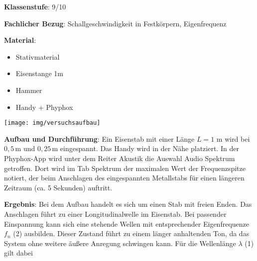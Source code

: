 \documentclass[../main.tex]{subfiles}
\begin{document}
\begin{tcolorbox}[
    width=\textwidth,
    height=\textheight,
    title=Phyphox: Schallgeschwindigkeit in Festkörpern,
    fonttitle=\Large,
    before title=\vspace{0.2cm}, after title=\vspace{0.2cm},
    colback=white,
    title filled=true, 
    colbacktitle=myorange,
    colframe=black,
    coltitle=black,
    ]

    \vspace{0.2cm}
    \textbf{Klassenstufe}: 9/10

    \vspace{0.4cm}

    \textbf{Fachlicher Bezug}: Schallgeschwindigkeit in Festkörpern, Eigenfrequenz

    \begin{minipage}[]{0.5\textwidth}
        \vspace{0.4cm} 
        \textbf{Material}:
        \begin{itemize}[noitemsep]
            \item Stativmaterial
            \item Eisenstange 1m
            \item Hammer
            \item Handy + Phyphox
        \end{itemize}

    \end{minipage}
    \hspace{1.4cm}
    \begin{minipage}[]{0.45\textwidth}
        \vspace{0.3cm}
        \texttt{[image: img/versuchsaufbau]}
    \end{minipage}

    \vspace{0.4cm}
    \textbf{Aufbau und Durchführung}: Ein Eisenstab mit einer Länge $L=1$ m wird bei $0,5\,$m und $0,25\,$m eingespannt. Das Handy wird in der Nähe platziert. In der Phyphox-App wird unter dem Reiter \glqq Akustik\grqq{} die Auswahl \glqq Audio Spektrum\grqq{} getroffen. Dort wird im Tab \glqq Spektrum\grqq{} der maximalen Wert der Frequenzspitze notiert, der beim Anschlagen des eingespannten Metallstabs für einen längeren Zeitraum (ca. 5 Sekunden) auftritt.

    \vspace{0.4cm}
    \textbf{Ergebnis}: Bei dem Aufbau handelt es sich um einen Stab mit freien Enden. Das Anschlagen führt zu einer Longitudinalwelle im Eisenstab. Bei passender Einspannung kann sich eine stehende Wellen mit entsprechender Eigenfrequenze $f_n$ (2) ausbilden. Dieser Zustand führt zu einem länger anhaltenden Ton, da das System ohne weitere äußere Anregung schwingen kann. Für die Wellenlänge $\lambda$ (1) gilt dabei


\end{tcolorbox}
\end{document}
